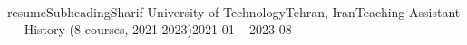 \\resumeSubheading{Sharif University of Technology}{Tehran, Iran}{Teaching Assistant — History (8 courses, 2021-2023)}{2021-01 -- 2023-08}
